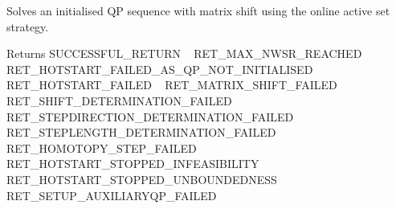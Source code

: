 Solves an initialised QP sequence with matrix shift using the online active set strategy. \begin{DoxyReturn}{Returns}
S\+U\+C\+C\+E\+S\+S\+F\+U\+L\+\_\+\+R\+E\+T\+U\+RN ~\newline
 R\+E\+T\+\_\+\+M\+A\+X\+\_\+\+N\+W\+S\+R\+\_\+\+R\+E\+A\+C\+H\+ED ~\newline
 R\+E\+T\+\_\+\+H\+O\+T\+S\+T\+A\+R\+T\+\_\+\+F\+A\+I\+L\+E\+D\+\_\+\+A\+S\+\_\+\+Q\+P\+\_\+\+N\+O\+T\+\_\+\+I\+N\+I\+T\+I\+A\+L\+I\+S\+ED ~\newline
 R\+E\+T\+\_\+\+H\+O\+T\+S\+T\+A\+R\+T\+\_\+\+F\+A\+I\+L\+ED ~\newline
 R\+E\+T\+\_\+\+M\+A\+T\+R\+I\+X\+\_\+\+S\+H\+I\+F\+T\+\_\+\+F\+A\+I\+L\+ED ~\newline
 R\+E\+T\+\_\+\+S\+H\+I\+F\+T\+\_\+\+D\+E\+T\+E\+R\+M\+I\+N\+A\+T\+I\+O\+N\+\_\+\+F\+A\+I\+L\+ED ~\newline
 R\+E\+T\+\_\+\+S\+T\+E\+P\+D\+I\+R\+E\+C\+T\+I\+O\+N\+\_\+\+D\+E\+T\+E\+R\+M\+I\+N\+A\+T\+I\+O\+N\+\_\+\+F\+A\+I\+L\+ED ~\newline
 R\+E\+T\+\_\+\+S\+T\+E\+P\+L\+E\+N\+G\+T\+H\+\_\+\+D\+E\+T\+E\+R\+M\+I\+N\+A\+T\+I\+O\+N\+\_\+\+F\+A\+I\+L\+ED ~\newline
 R\+E\+T\+\_\+\+H\+O\+M\+O\+T\+O\+P\+Y\+\_\+\+S\+T\+E\+P\+\_\+\+F\+A\+I\+L\+ED ~\newline
 R\+E\+T\+\_\+\+H\+O\+T\+S\+T\+A\+R\+T\+\_\+\+S\+T\+O\+P\+P\+E\+D\+\_\+\+I\+N\+F\+E\+A\+S\+I\+B\+I\+L\+I\+TY ~\newline
 R\+E\+T\+\_\+\+H\+O\+T\+S\+T\+A\+R\+T\+\_\+\+S\+T\+O\+P\+P\+E\+D\+\_\+\+U\+N\+B\+O\+U\+N\+D\+E\+D\+N\+E\+SS ~\newline
 R\+E\+T\+\_\+\+S\+E\+T\+U\+P\+\_\+\+A\+U\+X\+I\+L\+I\+A\+R\+Y\+Q\+P\+\_\+\+F\+A\+I\+L\+ED 
\end{DoxyReturn}

